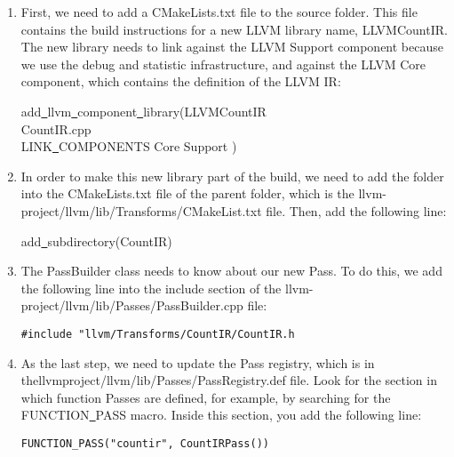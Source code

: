 \begin{enumerate}
\item First, we need to add a CMakeLists.txt file to the source folder. This file contains the build instructions for a new LLVM library name, LLVMCountIR. The new library needs to link against the LLVM Support component because we use the debug and statistic infrastructure, and against the LLVM Core component, which contains the definition of the LLVM IR:
\begin{tcolorbox}[colback=white,colframe=black]
add\underline{~}llvm\underline{~}component\underline{~}library(LLVMCountIR \\
\hspace*{0.5cm}CountIR.cpp \\
\hspace*{0.5cm}LINK\underline{~}COMPONENTS Core Support )
\end{tcolorbox}

\item In order to make this new library part of the build, we need to add the folder into the CMakeLists.txt file of the parent folder, which is the llvm-project/llvm/lib/Transforms/CMakeList.txt file. Then, add the following line:
\begin{tcolorbox}[colback=white,colframe=black]
add\underline{~}subdirectory(CountIR)
\end{tcolorbox}

\item The PassBuilder class needs to know about our new Pass. To do this, we add the following line into the include section of the llvm-project/llvm/lib/Passes/PassBuilder.cpp file:
\begin{lstlisting}[caption={}]
#include "llvm/Transforms/CountIR/CountIR.h
\end{lstlisting}

\item As the last step, we need to update the Pass registry, which is in thellvmproject/llvm/lib/Passes/PassRegistry.def file. Look for the section in which function Passes are defined, for example, by searching for the FUNCTION\underline{~}PASS macro. Inside this section, you add the following line:
\begin{lstlisting}[caption={}]
FUNCTION_PASS("countir", CountIRPass())
\end{lstlisting}


\end{enumerate}
